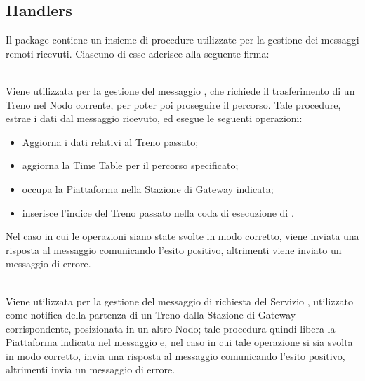 	\subsection{Handlers}
	
	Il package  contiene un insieme di procedure utilizzate per la gestione dei messaggi remoti ricevuti. Ciascuno di esse aderisce alla seguente firma:
\begin{center}
\end{center}
	\begin{description}
	
		\item {}\\
		Viene utilizzata per la gestione del messaggio , che richiede il trasferimento di un Treno nel Nodo corrente, per poter poi proseguire il percorso. Tale procedure, estrae i dati dal messaggio ricevuto, ed esegue le seguenti operazioni:
			\begin{itemize} 
				\item Aggiorna i dati relativi al Treno passato;
			 	\item aggiorna la Time Table per il percorso specificato;
			 	\item occupa la Piattaforma nella Stazione di Gateway indicata;
			 	\item inserisce l'indice del Treno passato nella coda di esecuzione di . 
			 \end{itemize}
		Nel caso in cui le operazioni siano state svolte in modo corretto, viene inviata una risposta al messaggio comunicando l'esito positivo, altrimenti viene inviato un messaggio di errore.
		
		\item {}\\
		Viene utilizzata per la gestione del messaggio di richiesta del Servizio , utilizzato come notifica della partenza di un Treno dalla Stazione di Gateway corrispondente, posizionata in un altro Nodo; tale procedura quindi libera la Piattaforma indicata nel messaggio e, nel caso in cui tale operazione si sia svolta in modo corretto, invia una risposta al messaggio comunicando l'esito positivo, altrimenti invia un messaggio di errore.
		

\end{description}
